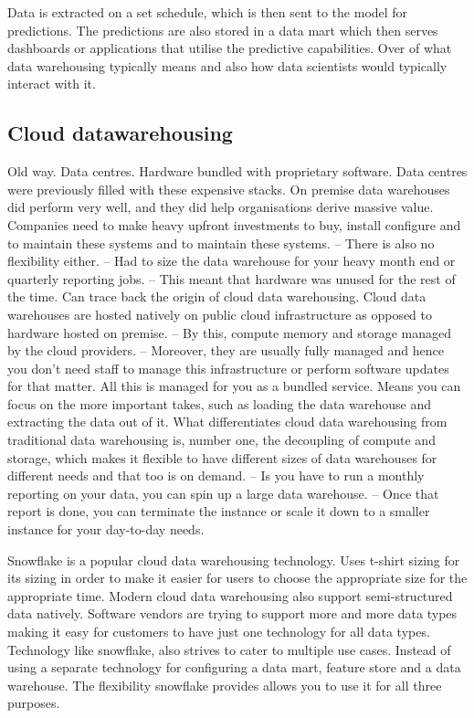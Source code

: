 \documentclass[a4paper, 11pt]{article}
\begin{document}
    Data is extracted on a set schedule, which is then sent to the model for predictions.
    The predictions are also stored in a data mart which then serves dashboards or applications that utilise the predictive capabilities.
    Over of what data warehousing typically means and also how data scientists would typically interact with it.

    \subsection{Cloud datawarehousing}

    Old way. Data centres. Hardware bundled with proprietary software.
    Data centres were previously filled with these expensive stacks.
    On premise data warehouses did perform very well, and they did help organisations derive massive value.
    Companies need to make heavy upfront investments to buy, install configure and to maintain these systems and to maintain these systems.
    -- There is also no flexibility either.
    -- Had to size the data warehouse for your heavy month end or quarterly reporting jobs.
    -- This meant that hardware was unused for the rest of the time.
    Can trace back the origin of cloud data warehousing.
    Cloud data warehouses are hosted natively on public cloud infrastructure as opposed to hardware hosted on premise.
    -- By this, compute memory and storage managed by the cloud providers.
    -- Moreover, they are usually fully managed and hence you don't need staff to manage this infrastructure or perform software updates for that matter.
    All this is managed for you as a bundled service.
    Means you can focus on the more important takes, such as loading the data warehouse and extracting the data out of it.
    What differentiates cloud data warehousing from traditional data warehousing is, number one, the decoupling of compute and storage, which makes it flexible to have different sizes of data warehouses for different needs and that too is on demand.
    -- Is you have to run a monthly reporting on your data, you can spin up a large data warehouse.
    -- Once that report is done, you can terminate the instance or scale it down to a smaller instance for your day-to-day needs.

    Snowflake is a popular cloud data warehousing technology.
    Uses t-shirt sizing for its sizing in order to make it easier for users to choose the appropriate size for the appropriate time.
    Modern cloud data warehousing also support semi-structured data natively.
    Software vendors are trying to support more and more data types making it easy for customers to have just one technology for all data types.
    Technology like snowflake, also strives to cater to multiple use cases.
    Instead of using a separate technology for configuring a data mart, feature store and a data warehouse.
    The flexibility snowflake provides allows you to use it for all three purposes.
\end{document}
